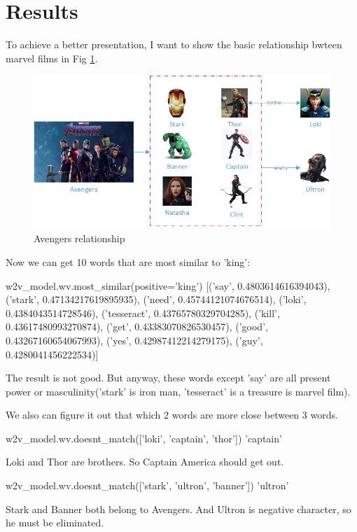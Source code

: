 \documentclass[a4paper,10pt]{article}
\begin{document}
\section{Results}
To achieve a better presentation, I want to show the basic relationship bwteen marvel films in Fig \ref{Fig.marvel}.
\begin{figure}[htpb]
\centering 
\includegraphics[width=1.0\textwidth]{report_image/marvel.png} 
\caption{Avengers relationship} 
\label{Fig.marvel} 
\end{figure}

Now we can get 10 words that are most similar to 'king':
\begin{python}
w2v_model.wv.most_similar(positive='king')
[('say', 0.4803614616394043),
 ('stark', 0.47134217619895935),
 ('need', 0.45744121074676514),
 ('loki', 0.4384043514728546),
 ('tesseract', 0.43765780329704285),
 ('kill', 0.43617480993270874),
 ('get', 0.43383070826530457),
 ('good', 0.43267160654067993),
 ('yes', 0.42987412214279175),
 ('guy', 0.4280041456222534)]
\end{python}
The result is not good. But anyway, these words except 'say' are all present power or masculinity('stark' is iron man, 'tesseract' is a treasure is marvel film).

We also can figure it out that which 2 words are more close between 3 words.
\begin{python}
w2v_model.wv.doesnt_match(['loki', 'captain', 'thor'])
'captain'
\end{python}
Loki and Thor are brothers. So Captain America should get out.
\begin{python}
w2v_model.wv.doesnt_match(['stark', 'ultron', 'banner'])
'ultron'
\end{python}
Stark and Banner both belong to Avengers. And Ultron is negative character, so he must be eliminated.
 
\end{document}

